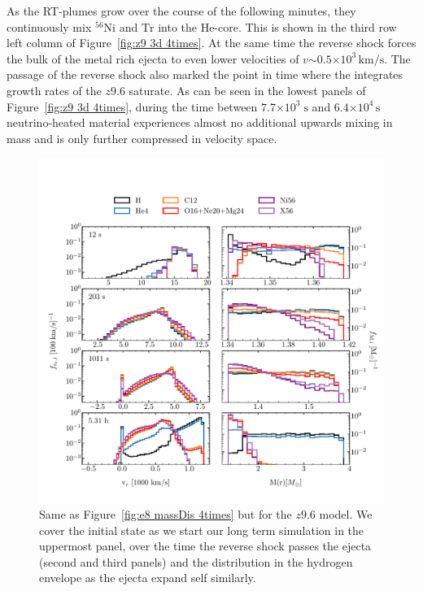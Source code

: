 \documentclass[fleqn,usenatbib]{mnras}
\newcommand{\nickel}{\ensuremath{\mathrm{^{56}Ni}}\xspace}
\newcommand{\tracer}{\ensuremath{\mathrm{Tr}}\xspace}
\newcommand{\s}{\ensuremath{\text{s}}}
\begin{document}
As the RT-plumes grow over the course of the following minutes, they continuously mix $\nickel$ and $\tracer$ into the He-core. This is shown in the third row left column of Figure~\ref{fig:z9 3d 4times}. At the same time the reverse shock forces the bulk of the metal rich ejecta to even lower velocities of  $v\mathord{\sim} 0.5\mathord{\times}10^3\,\mathrm{km/s}$. The passage of the reverse shock also marked the point in time where the integrates growth rates of the $z9.6$ saturate. As can be seen in the lowest panels of Figure~\ref{fig:z9 3d 4times}, during the time between  $7.7\mathord{\times} 10^3\;\s$ and $6.4 \mathord{\times} 10^4\,\s$ neutrino-heated material experiences almost no additional upwards mixing in mass and is only further compressed in velocity space.
\begin{figure}%
 \centering
 \includegraphics[width=\textwidth,trim=0cm 0.6cm 0cm 1cm,clip]{pic/z93_3d_massDis_mvr_mas_4times_paper.pdf}
 \caption{Same as Figure~\ref{fig:e8 massDis 4times} but for the $z9.6$ model. We cover the initial state as we start our long term simulation in the uppermost panel, over the time the reverse shock passes the ejecta (second and third panels) and the distribution in the hydrogen envelope as the ejecta expand self similarly.}
 \label{fig:z9 massDis}
\end{figure}
\end{document}
